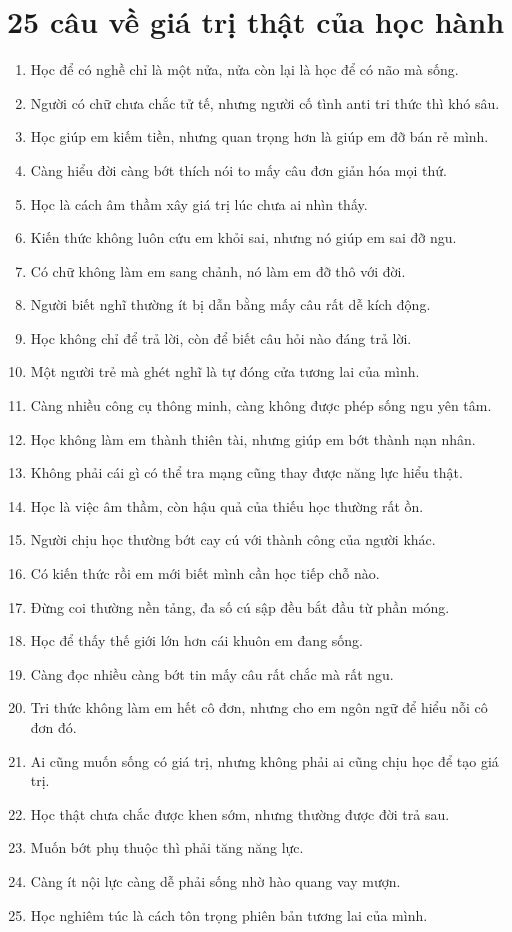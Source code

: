 \section{25 câu về giá trị thật của học hành}
\begin{enumerate}[leftmargin=*,resume]
\item Học để có nghề chỉ là một nửa, nửa còn lại là học để có não mà sống.
\item Người có chữ chưa chắc tử tế, nhưng người cố tình anti tri thức thì khó sâu.
\item Học giúp em kiếm tiền, nhưng quan trọng hơn là giúp em đỡ bán rẻ mình.
\item Càng hiểu đời càng bớt thích nói to mấy câu đơn giản hóa mọi thứ.
\item Học là cách âm thầm xây giá trị lúc chưa ai nhìn thấy.
\item Kiến thức không luôn cứu em khỏi sai, nhưng nó giúp em sai đỡ ngu.
\item Có chữ không làm em sang chảnh, nó làm em đỡ thô với đời.
\item Người biết nghĩ thường ít bị dẫn bằng mấy câu rất dễ kích động.
\item Học không chỉ để trả lời, còn để biết câu hỏi nào đáng trả lời.
\item Một người trẻ mà ghét nghĩ là tự đóng cửa tương lai của mình.
\item Càng nhiều công cụ thông minh, càng không được phép sống ngu yên tâm.
\item Học không làm em thành thiên tài, nhưng giúp em bớt thành nạn nhân.
\item Không phải cái gì có thể tra mạng cũng thay được năng lực hiểu thật.
\item Học là việc âm thầm, còn hậu quả của thiếu học thường rất ồn.
\item Người chịu học thường bớt cay cú với thành công của người khác.
\item Có kiến thức rồi em mới biết mình cần học tiếp chỗ nào.
\item Đừng coi thường nền tảng, đa số cú sập đều bắt đầu từ phần móng.
\item Học để thấy thế giới lớn hơn cái khuôn em đang sống.
\item Càng đọc nhiều càng bớt tin mấy câu rất chắc mà rất ngu.
\item Tri thức không làm em hết cô đơn, nhưng cho em ngôn ngữ để hiểu nỗi cô đơn đó.
\item Ai cũng muốn sống có giá trị, nhưng không phải ai cũng chịu học để tạo giá trị.
\item Học thật chưa chắc được khen sớm, nhưng thường được đời trả sau.
\item Muốn bớt phụ thuộc thì phải tăng năng lực.
\item Càng ít nội lực càng dễ phải sống nhờ hào quang vay mượn.
\item Học nghiêm túc là cách tôn trọng phiên bản tương lai của mình.
\end{enumerate}

